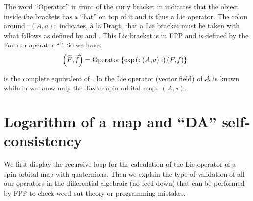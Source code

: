 \documentclass[english,12pt,article]{article} %
\begin{document}
{{{%
The word ``Operator'' in front of the curly bracket in  indicates that the object inside the brackets has a ``hat'' on top of it and is thus a Lie operator.  The colon around $:(A,a):$ indicates, \`a la Dragt, that a Lie bracket must be taken with what follows as defined by  and . This Lie bracket is in FPP and is defined by the Fortran operator ``''. So we have:
%
%
\begin{align} \  \left({\widetilde{F},\widetilde{f}}\right)&=  {{\rm O}{\rm p}{\rm e}{\rm r}{\rm a}{\rm t}{\rm o}{\rm r}\left\{{\exp\left({:(A,a):}\right)(F,f)}\right\}}^{}  \label{afpp}\end{align}

 is the complete equivalent of .  In  the Lie operator (vector field) of $\cal A$ is known while in  we know only the Taylor spin-orbital maps $(A,a)$.

\section{Logarithm of a map and  ``DA'' self-consistency}\label{sec:logval}

We first display the recursive loop for the calculation of the Lie operator of a spin-orbital map with quaternions. Then we explain the type of validation of all our operators in the differential algebraic (no feed down) that can be performed by FPP to check weed out theory or programming mistakes.
 
}}}
\end{document}
